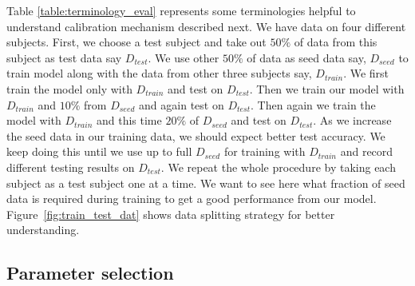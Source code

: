 \documentclass[10pt,twocolumn,letterpaper]{article}
\begin{document}
Table \ref{table:terminology_eval} represents some terminologies helpful to understand calibration mechanism described next.
We have data on four different subjects. First, we choose a test subject and take out $50\%$ of data from this subject as test data say $D_{test}$. We use other $50\%$ of data as seed data say, $D_{seed}$ to train model along with the data from other three subjects say, $D_{train}$. We first train the model only with $D_{train}$ and test on $D_{test}$. Then we train our model with $D_{train}$ and $10\%$ from $D_{seed}$ and again test on $D_{test}$. Then again we train the model with $D_{train}$ and this time $20\%$ of $D_{seed}$ and test on $D_{test}$. As we increase the seed data in our training data, we should expect better test accuracy. We keep doing this until we use up to full $D_{seed}$ for training with $D_{train}$ and record different testing results on $D_{test}$. We repeat the whole procedure by taking each subject as a test subject one at a time. We want to see here what fraction of seed data is required during training to get a good performance from our model. Figure~\ref{fig:train_test_dat} shows data splitting strategy for better understanding.

\subsection{Parameter selection}
\end{document}
